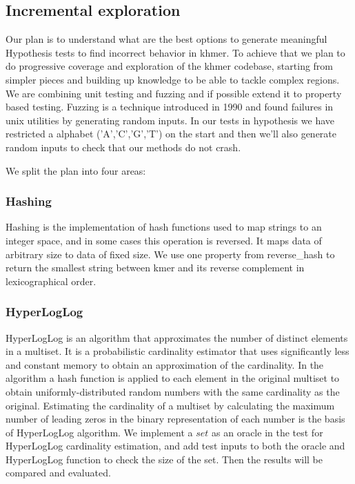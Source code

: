 \documentclass[preprint,nocopyrightspace]{sig-alternate}
\begin{document}
\subsection{Incremental exploration}
Our plan is to understand what are the best options to generate meaningful Hypothesis tests to find incorrect behavior in khmer.
To achieve that we plan to do progressive coverage and exploration of the khmer codebase,
starting from simpler pieces and building up knowledge to be able to tackle complex regions.
We are combining unit testing and fuzzing and if possible extend it to property based testing.
Fuzzing \citet{qi2013research} is a technique introduced in 1990 and found failures in unix utilities by generating random inputs.
In our tests in hypothesis we have restricted a alphabet ('A','C','G','T') on the start and then we'll also  
generate random inputs to check that our methods do not crash.

We split the plan into four areas:

\subsubsection{Hashing}
Hashing is the implementation of hash functions used to map strings to an integer space,
and in some cases this operation is reversed.
It maps data of arbitrary size to data of fixed size.
We use one property from reverse\_hash to return the smallest string between kmer and its reverse complement in lexicographical order.

\subsubsection{HyperLogLog}
HyperLogLog is an algorithm that approximates the number of distinct elements in a multiset.
It is a probabilistic cardinality estimator that uses significantly less and constant memory to obtain an approximation of the cardinality.
In the algorithm a hash function is applied to each element in the original multiset to obtain uniformly-distributed random numbers with the same cardinality as the original.
Estimating the cardinality of a multiset by calculating the maximum number of leading zeros in the binary representation of each number is the basis of HyperLogLog algorithm.
We implement a $set$ as an oracle in the test for HyperLogLog cardinality estimation,
and add test inputs to both the oracle and HyperLogLog function to check the size of the set.
Then the results will be compared and evaluated. 
\end{document}
